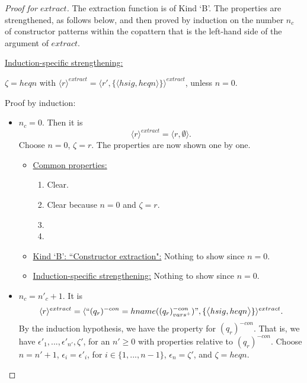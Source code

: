 \documentclass[11pt]{article} %
\begin{document}
\begin{proof}[Proof for $extract$]

The extraction function is of Kind `B'. The properties are strengthened, as follows below, and then proved by induction on the number $n_c$ of constructor patterns within the copattern that is the left-hand side of the argument of $extract$.

\underline{Induction-specific strengthening:}

$\zeta = heqn$ with $\langle r \rangle^{extract} = \langle r', \{\big\langle hsig, heqn \big\rangle\} \rangle^{extract}$, unless $n = 0$.

Proof by induction:

\begin{itemize}

\item $n_c = 0$.
Then it is
\begin{equation*}
\langle r \rangle^{extract} = \big\langle r, \emptyset \big\rangle.
\end{equation*}
Choose $n = 0$, $\zeta = r$. The properties are now shown one by one.

\begin{itemize}
\item \underline{Common properties:}
\begin{enumerate}
\item Clear.
\item Clear because $n = 0$ and $\zeta = r$.
\item
\item 
\end{enumerate}

\item \underline{Kind `B': ``Constructor extraction":} Nothing to show since $n = 0$.

\item \underline{Induction-specific strengthening:} Nothing to show since $n = 0$.
\end{itemize}

\item $n_c = n'_c + 1$.
It is
\begin{equation*}
\langle r \rangle^{extract} = \langle `` (q_r)^{-con} = hname((q_r)^{-con}_{vars^+}) ", \{\big\langle hsig, heqn \big\rangle\} \rangle^{extract}.
\end{equation*}
By the induction hypothesis, we have the property for $(q_r)^{-con}$. That is, we have $\epsilon'_1, ..., \epsilon'_{n'}, \zeta'$, for an $n' \geq 0$ with properties relative to $(q_r)^{-con}$. Choose $n = n'+1$, $\epsilon_i = \epsilon'_i$, for $i \in \{1, ..., n-1\}$, $\epsilon_n = \zeta'$, and $\zeta = heqn$.


\end{itemize}
\end{proof}
\end{document}
